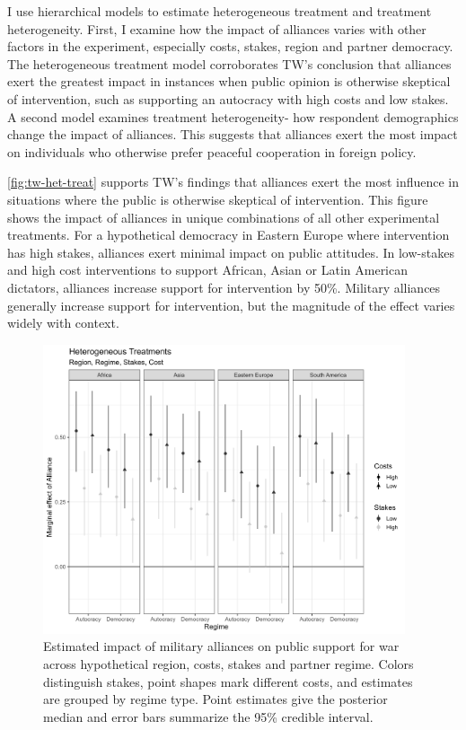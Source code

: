 \documentclass[12pt]{article}
\begin{document}
I use hierarchical models to estimate heterogeneous treatment and treatment heterogeneity. 
First, I examine how the impact of alliances varies with other factors in the experiment, especially costs, stakes, region and partner democracy.
The heterogeneous treatment model corroborates TW's conclusion that alliances exert the greatest impact in instances when public opinion is otherwise skeptical of intervention, such as supporting an autocracy with high costs and low stakes.  
A second model examines treatment heterogeneity- how respondent demographics change the impact of alliances. 
This suggests that alliances exert the most impact on individuals who otherwise prefer peaceful cooperation in foreign policy.  


\autoref{fig:tw-het-treat} supports TW's findings that alliances exert the most influence in situations where the public is otherwise skeptical of intervention. 
This figure shows the impact of alliances in unique combinations of all other experimental treatments. 
For a hypothetical democracy in Eastern Europe where intervention has high stakes, alliances exert minimal impact on public attitudes. 
In low-stakes and high cost interventions to support African, Asian or Latin American dictators, alliances increase support for intervention by 50\%. 
Military alliances generally increase support for intervention, but the magnitude of the effect varies widely with context. 


\begin{figure}[htpb]
	\centering
		\includegraphics[width=0.95\textwidth]{../figures/tw-het-treat.png}
	\caption{Estimated impact of military alliances on public support for war across hypothetical region, costs, stakes and partner regime. Colors distinguish stakes, point shapes mark different costs, and estimates are grouped by regime type. Point estimates give the posterior median and error bars summarize the 95\% credible interval.}
	\label{fig:tw-het-treat}
\end{figure}
\end{document}
